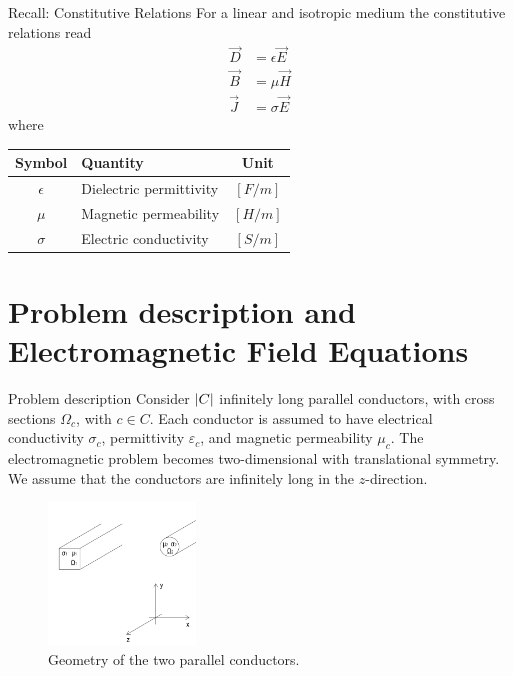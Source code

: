 \documentclass[aspectratio=54,xcolor=dvipsnames]{beamer}
\begin{document}
\begin{frame}{Recall: Constitutive Relations}
    For a linear and isotropic medium the constitutive relations read
    \begin{align*}
        \vec{D} &= \epsilon \vec{E} \\
        \vec{B} &= \mu \vec{H} \\
        \vec{J} &= \sigma \vec{E}
    \end{align*}
    \vspace{0.5em}
    where
    \begin{center}
    \begin{tabular}{|c|l|c|}
        \hline
        Symbol & Quantity & Unit \\
        \hline
        $\epsilon$ & Dielectric permittivity & $[F/m]$ \\
        $\mu$ & Magnetic permeability & $[H/m]$ \\
        $\sigma$ & Electric conductivity & $[S/m]$ \\
        \hline
    \end{tabular}
    \end{center}
\end{frame}

\section{Problem description and Electromagnetic Field Equations}
\begin{frame}{Problem description}
    Consider $\abs{C}$ infinitely long parallel conductors, with cross sections $\Omega_c$, with $c \in C$. Each conductor is assumed to have electrical conductivity $\sigma_c$, permittivity $\varepsilon_c$, and magnetic permeability $\mu_c$. The electromagnetic problem becomes two-dimensional with translational symmetry. We assume that the conductors are infinitely long in the $z$-direction.
        \begin{figure}[h]
            \centering
            \includegraphics[width=0.35\textwidth]{Images/Conductors_figure.png}
            \caption{Geometry of the two parallel conductors.}
            \label{fig:conductors}
        \end{figure}
\end{frame}
\end{document}
